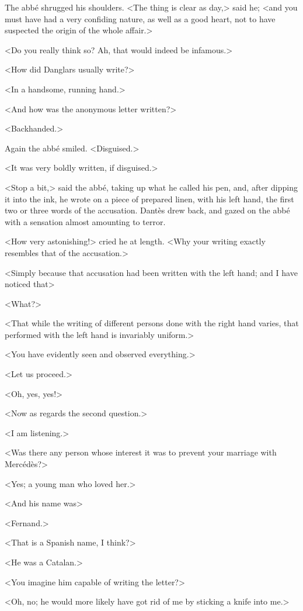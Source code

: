  The abbé shrugged his shoulders. <The thing is clear as day,> said he; <and you must have had a very confiding nature, as well as a good heart, not to have suspected the origin of the whole affair.> 

 <Do you really think so? Ah, that would indeed be infamous.> 

 <How did Danglars usually write?> 

 <In a handsome, running hand.> 

 <And how was the anonymous letter written?> 

 <Backhanded.> 

 Again the abbé smiled. <Disguised.> 

 <It was very boldly written, if disguised.> 

 <Stop a bit,> said the abbé, taking up what he called his pen, and, after dipping it into the ink, he wrote on a piece of prepared linen, with his left hand, the first two or three words of the accusation. Dantès drew back, and gazed on the abbé with a sensation almost amounting to terror. 

 <How very astonishing!> cried he at length. <Why your writing exactly resembles that of the accusation.> 

 <Simply because that accusation had been written with the left hand; and I have noticed that\longdash> 

 <What?> 

 <That while the writing of different persons done with the right hand varies, that performed with the left hand is invariably uniform.> 

 <You have evidently seen and observed everything.> 

 <Let us proceed.> 

 <Oh, yes, yes!> 

 <Now as regards the second question.> 

 <I am listening.> 

 <Was there any person whose interest it was to prevent your marriage with Mercédès?> 

 <Yes; a young man who loved her.> 

 <And his name was\longdash> 

 <Fernand.> 

 <That is a Spanish name, I think?> 

 <He was a Catalan.> 

 <You imagine him capable of writing the letter?> 

 <Oh, no; he would more likely have got rid of me by sticking a knife into me.> 

